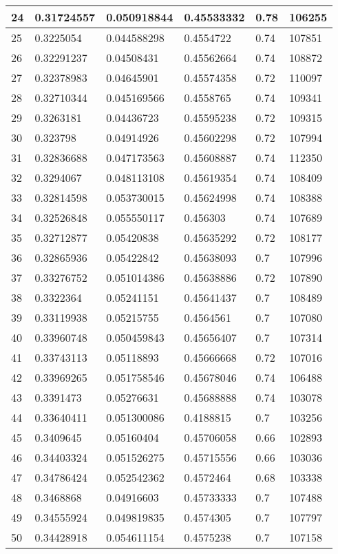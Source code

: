 \begin{longtable}{|l|l|l|l|l|l|}
24 & 0.31724557 & 0.050918844 & 0.45533332 & 0.78 & 106255 \\ \hline 
25 & 0.3225054 & 0.044588298 & 0.4554722 & 0.74 & 107851 \\ \hline 
26 & 0.32291237 & 0.04508431 & 0.45562664 & 0.74 & 108872 \\ \hline 
27 & 0.32378983 & 0.04645901 & 0.45574358 & 0.72 & 110097 \\ \hline 
28 & 0.32710344 & 0.045169566 & 0.4558765 & 0.74 & 109341 \\ \hline 
29 & 0.3263181 & 0.04436723 & 0.45595238 & 0.72 & 109315 \\ \hline 
30 & 0.323798 & 0.04914926 & 0.45602298 & 0.72 & 107994 \\ \hline 
31 & 0.32836688 & 0.047173563 & 0.45608887 & 0.74 & 112350 \\ \hline 
32 & 0.3294067 & 0.048113108 & 0.45619354 & 0.74 & 108409 \\ \hline 
33 & 0.32814598 & 0.053730015 & 0.45624998 & 0.74 & 108388 \\ \hline 
34 & 0.32526848 & 0.055550117 & 0.456303 & 0.74 & 107689 \\ \hline 
35 & 0.32712877 & 0.05420838 & 0.45635292 & 0.72 & 108177 \\ \hline 
36 & 0.32865936 & 0.05422842 & 0.45638093 & 0.7 & 107996 \\ \hline 
37 & 0.33276752 & 0.051014386 & 0.45638886 & 0.72 & 107890 \\ \hline 
38 & 0.3322364 & 0.05241151 & 0.45641437 & 0.7 & 108489 \\ \hline 
39 & 0.33119938 & 0.05215755 & 0.4564561 & 0.7 & 107080 \\ \hline 
40 & 0.33960748 & 0.050459843 & 0.45656407 & 0.7 & 107314 \\ \hline 
41 & 0.33743113 & 0.05118893 & 0.45666668 & 0.72 & 107016 \\ \hline 
42 & 0.33969265 & 0.051758546 & 0.45678046 & 0.74 & 106488 \\ \hline 
43 & 0.3391473 & 0.05276631 & 0.45688888 & 0.74 & 103078 \\ \hline 
44 & 0.33640411 & 0.051300086 & 0.4188815 & 0.7 & 103256 \\ \hline 
45 & 0.3409645 & 0.05160404 & 0.45706058 & 0.66 & 102893 \\ \hline 
46 & 0.34403324 & 0.051526275 & 0.45715556 & 0.66 & 103036 \\ \hline 
47 & 0.34786424 & 0.052542362 & 0.4572464 & 0.68 & 103338 \\ \hline 
48 & 0.3468868 & 0.04916603 & 0.45733333 & 0.7 & 107488 \\ \hline 
49 & 0.34555924 & 0.049819835 & 0.4574305 & 0.7 & 107797 \\ \hline 
50 & 0.34428918 & 0.054611154 & 0.4575238 & 0.7 & 107158 \\ \hline 
\end{longtable}